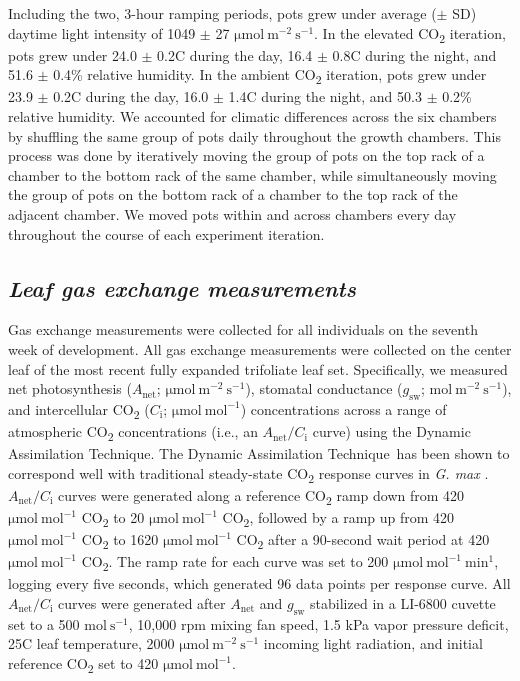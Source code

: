 Including the two, 3-hour ramping periods, pots grew under average ($\pm$ SD) daytime light intensity of 1049 $\pm$ 27 $\mathrm{\mu mol\ m^{-2}\ s^{-1}}$. In the elevated CO\textsubscript{2} iteration, pots grew under 24.0 $\pm$ 0.2\textdegree{}C during the day, 16.4 $\pm$ 0.8\textdegree{}C during the night, and 51.6 $\pm$ 0.4\% relative humidity. In the ambient CO\textsubscript{2} iteration, pots grew under 23.9 $\pm$ 0.2\textdegree{}C during the day, 16.0 $\pm$ 1.4\textdegree{}C during the night, and 50.3 $\pm$ 0.2\% relative humidity. We accounted for climatic differences across the six chambers by shuffling the same group of pots daily throughout the growth chambers. This process was done by iteratively moving the group of pots on the top rack of a chamber to the bottom rack of the same chamber, while simultaneously moving the group of pots on the bottom rack of a chamber to the top rack of the adjacent chamber. We moved pots within and across chambers every day throughout the course of each experiment iteration.

\subsection{\textit{Leaf gas exchange measurements}}
Gas exchange measurements were collected for all individuals on the seventh week of development. All gas exchange measurements were collected on the center leaf of the most recent fully expanded trifoliate leaf set. Specifically, we measured net photosynthesis ($A_\mathrm{{net}}$; $\mathrm{\mu mol\ m^{-2}\ s^{-1}}$), stomatal conductance ($g_\mathrm{{sw}}$; $\mathrm{mol\ m^{-2}\ s^{-1}}$), and intercellular CO\textsubscript{2} ($C_\mathrm{{i}}$; $\mathrm{\mu mol\ mol^{-1}}$) concentrations across a range of atmospheric CO\textsubscript{2} concentrations (i.e., an $A_\mathrm{{net}}/C_\mathrm{i}$ curve) using the Dynamic Assimilation Technique\texttrademark. The Dynamic Assimilation Technique\texttrademark\ has been shown to correspond well with traditional steady-state CO\textsubscript{2} response curves in \textit{G. max} . $A_\mathrm{{net}}/C_\mathrm{i}$ curves were generated along a reference CO\textsubscript{2} ramp down from 420 $\mathrm{\mu mol\ mol^{-1}}$ CO\textsubscript{2} to 20 $\mathrm{\mu mol\ mol^{-1}}$ CO\textsubscript{2}, followed by a ramp up from 420 $\mathrm{\mu mol\ mol^{-1}}$ CO\textsubscript{2} to 1620 $\mathrm{\mu mol\ mol^{-1}}$ CO\textsubscript{2} after a 90-second wait period at 420 $\mathrm{\mu mol\ mol^{-1}}$ CO\textsubscript{2}. The ramp rate for each curve was set to 200 $\mathrm{\mu mol\ mol^{-1}\ min^{1}}$, logging every five seconds, which generated 96 data points per response curve. All $A_\mathrm{{net}}/C_\mathrm{i}$ curves were generated after $A_\mathrm{{net}}$ and $g_\mathrm{{sw}}$ stabilized in a LI-6800 cuvette set to a 500 $\mathrm{mol\ s^{-1}}$, 10,000 rpm mixing fan speed, 1.5 kPa vapor pressure deficit, 25\textdegree{}C leaf temperature, 2000 $\mathrm{\mu mol\ m^{-2}\ s^{-1}}$ incoming light radiation, and initial reference CO\textsubscript{2} set to 420 $\mathrm{\mu mol\ mol^{-1}}$.

